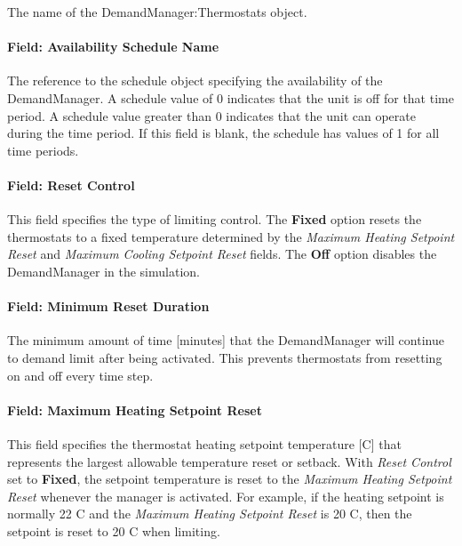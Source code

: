 The name of the DemandManager:Thermostats object.

\paragraph{Field: Availability Schedule Name}\label{field-availability-schedule-name-3-000}

The reference to the schedule object specifying the availability of the DemandManager. A schedule value of 0 indicates that the unit is off for that time period. A schedule value greater than 0 indicates that the unit can operate during the time period. If this field is blank, the schedule has values of 1 for all time periods.

\paragraph{Field: Reset Control}\label{field-reset-control}

This field specifies the type of limiting control. The \textbf{Fixed} option resets the thermostats to a fixed temperature determined by the \emph{Maximum Heating Setpoint Reset} and \emph{Maximum Cooling Setpoint Reset} fields. The \textbf{Off} option disables the DemandManager in the simulation.

\paragraph{Field: Minimum Reset Duration}\label{field-minimum-reset-duration}

The minimum amount of time {[}minutes{]} that the DemandManager will continue to demand limit after being activated. This prevents thermostats from resetting on and off every time step.

\paragraph{Field: Maximum Heating Setpoint Reset}\label{field-maximum-heating-setpoint-reset}

This field specifies the thermostat heating setpoint temperature {[}C{]} that represents the largest allowable temperature reset or setback. With \emph{Reset Control} set to \textbf{Fixed}, the setpoint temperature is reset to the \emph{Maximum Heating Setpoint Reset} whenever the manager is activated. For example, if the heating setpoint is normally 22 C and the \emph{Maximum Heating Setpoint Reset} is 20 C, then the setpoint is reset to 20 C when limiting.

